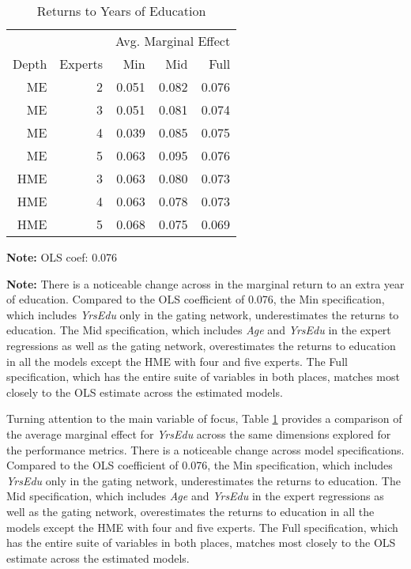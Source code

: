 \documentclass[12pt]{article}
\begin{document}
\begin{table} \centering
  \caption{Returns to Years of Education}
  \begin{threeparttable}
    \begin{tabular}[l]{r r r r r}
  \cmidrule{1-5}
        &         & \multicolumn{3}{c}{Avg. Marginal Effect} \\ 
  \cmidrule(r){3-5}
  Depth & Experts & Min   & Mid   & Full      \\
  \cmidrule{1-5}

  ME      & 2       & 0.051 & 0.082 & 0.076     \\
  ME      & 3       & 0.051 & 0.081 & 0.074     \\
  ME      & 4       & 0.039 & 0.085 & 0.075     \\
  ME      & 5       & 0.063 & 0.095 & 0.076     \\
  HME     & 3       & 0.063 & 0.080 & 0.073     \\
  HME     & 4       & 0.063 & 0.078 & 0.073     \\
  HME     & 5       & 0.068 & 0.075 & 0.069     \\

  \hline
    \end{tabular}
    \begin{tablenotes}
      \item{\footnotesize \textbf{Note:} OLS coef: 0.076}
      \item{\footnotesize \textbf{Note:} There is a noticeable change across in the marginal return to an extra year of education.
      Compared to the OLS coefficient of 0.076, the Min specification, which includes \textit{YrsEdu} only in the gating network, underestimates the returns to education.
      The Mid specification, which includes \textit{Age} and \textit{YrsEdu} in the expert regressions as well as the gating network, overestimates the returns to education in all the models except the HME with four and five experts.
      The Full specification, which has the entire suite of variables in both places, matches most closely to the OLS estimate across the estimated models.}
    \end{tablenotes} \label{tbl:YrsEdu_coef}
  \end{threeparttable}
\end{table}

\bigskip

Turning attention to the main variable of focus, Table \ref{tbl:YrsEdu_coef} provides a 
comparison of the average marginal effect for \textit{YrsEdu} across the same dimensions
explored for the performance metrics. There is a noticeable change across model specifications.
Compared to the OLS coefficient of 0.076, the Min specification,
which includes \textit{YrsEdu} only in the gating network, underestimates the returns
to education. The Mid specification, which includes \textit{Age} and
\textit{YrsEdu} in the expert regressions as well as the gating network,
overestimates the returns to education in all the models except the HME with four
and five experts. The Full specification, which has the entire suite of
variables in both places, matches most closely to the OLS estimate across the estimated
models.
\end{document}
